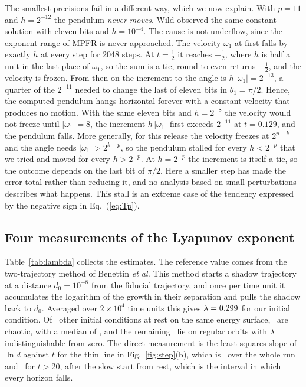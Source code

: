\documentclass[prb,reprint,amsmath,amssymb,longbibliography]{revtex4-1}
\begin{document}
The smallest precisions fail in a different way, which we now explain. With
$p=11$ and $h=2^{-12}$ the pendulum \emph{never moves}. Wild\cite{wild2019}
observed the same constant solution with eleven bits and $h=10^{-4}$. The cause
is not underflow, since the exponent range of MPFR is never approached. The
velocity $\omega_1$ at first falls by exactly $h$ at every step for 2048 steps.
At $t=\tfrac12$ it reaches $-\tfrac12$, where $h$ is half a unit in the last
place of $\omega_1$, so the sum is a tie, round-to-even returns $-\tfrac12$, and
the velocity is frozen. From then on the increment to the angle is
$h\,|\omega_1|=2^{-13}$, a quarter of the $2^{-11}$ needed to change the last of
eleven bits in $\theta_1=\pi/2$. Hence, the computed pendulum hangs horizontal
forever with a constant velocity that produces no motion. With the same eleven
bits and $h=2^{-8}$ the velocity would not freeze until $|\omega_1|=8$, the
increment $h\,|\omega_1|$ first exceeds $2^{-11}$ at $t=0.129$, and the pendulum
falls.
\ifdefined\longversion
More generally, for this release the velocity freezes at $2^{p-k}$ and the angle
needs $|\omega_1|>2^{k-p}$, so the pendulum stalled for every $h<2^{-p}$ that we
tried and moved for every $h>2^{-p}$. At $h=2^{-p}$ the increment is itself a
tie, so the outcome depends on the last bit of $\pi/2$.
\fi
Here a smaller step has made the error total rather than reducing it, and no
analysis based on small perturbations describes what happens. This stall is an
extreme case of the tendency expressed by the negative sign in
Eq.~(\ref{eq:Tp}).

\subsection{Four measurements of the Lyapunov exponent}

Table~\ref{tab:lambda} collects the estimates. The reference value comes from the
two-trajectory method of Benettin
\textit{et al.}\cite{benettin1976,wolf1985} This method starts a shadow
trajectory at a distance $d_0=10^{-8}$ from the fiducial trajectory, and once per
time unit it accumulates the logarithm of the growth in their separation and
pulls the shadow back to $d_0$. Averaged over $2\times10^4$ time units this gives
$\lambda=0.299$ for our initial condition. Of \nEns\ other initial conditions
at rest on the same energy surface, \nChaotic\ are chaotic, with a median of
\lamBenEns, and the remaining \nReg\ lie on regular orbits with $\lambda$
indistinguishable from zero. The direct measurement is the least-squares slope of
$\ln d$ against $t$ for the thin line in Fig.~\ref{fig:step}(b), which is
\lamDir\ over the whole run and \lamDirWin\ for $t>20$, after the slow start
from rest, which is the interval in which every horizon falls.
\end{document}
